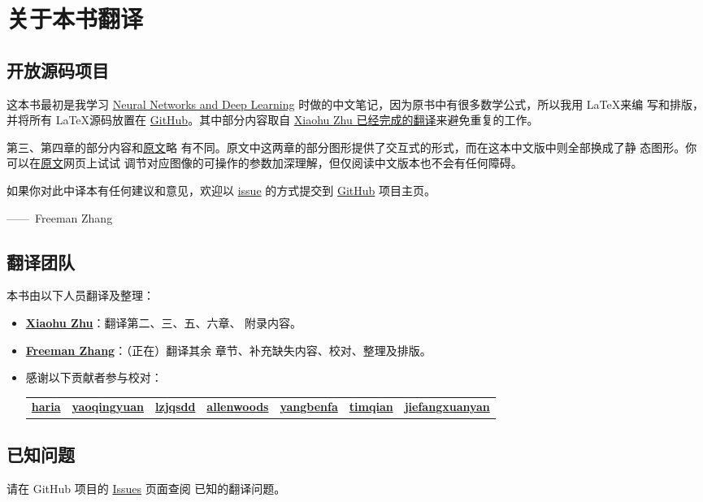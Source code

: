 
\chapter{关于本书翻译}
\label{ch:TranslationTeam}

\section*{开放源码项目}

这本书最初是我学习
\href{http://neuralnetworksanddeeplearning.com/index.html}{Neural Networks and
  Deep Learning} 时做的中文笔记，因为原书中有很多数学公式，所以我用 \LaTeX 来编
写和排版，并将所有 \LaTeX 源码放置在
\href{https://github.com/zhanggyb/nndl}{GitHub}。其中部分内容取自
\href{https://github.com/tigerneil/neural-networks-and-deep-learning-zh-cn}{Xiaohu
  Zhu 已经完成的翻译}来避免重复的工作。

第三、第四章的部分内容和\href{http://neuralnetworksanddeeplearning.com}{原文}略
有不同。原文中这两章的部分图形提供了交互式的形式，而在这本中文版中则全部换成了静
态图形。你可以在\href{http://neuralnetworksanddeeplearning.com}{原文}网页上试试
调节对应图像的可操作的参数加深理解，但仅阅读中文版本也不会有任何障碍。

如果你对此中译本有任何建议和意见，欢迎以
\href{https://github.com/zhanggyb/nndl/issues}{issue} 的方式提交到
\href{https://github.com/zhanggyb/nndl}{GitHub} 项目主页。

\begin{flushright}
  ——~Freeman Zhang
\end{flushright}

\section*{翻译团队}
\label{sec:TranslationTeam}

本书由以下人员翻译及整理：

\begin{itemize}
\item \textbf{\href{mailto:xhzhu.nju@gmail}{Xiaohu Zhu}}：翻译第二、三、五、六章、
  附录内容。
\item \textbf{\href{mailto:zhanggyb@gmail.com}{Freeman Zhang}}：（正在）翻译其余
  章节、补充缺失内容、校对、整理及排版。
\item 感谢以下贡献者参与校对：\\
    \begin{tabular}{l l l l l l l}
      \bfseries\href{https://github.com/haria}{haria} 
      & \bfseries\href{https://github.com/yaoqingyuan}{yaoqingyuan}
      & \bfseries\href{https://github.com/lzjqsdd}{lzjqsdd}
      & \bfseries\href{https://github.com/allenwoods}{allenwoods}
      & \bfseries\href{https://github.com/yangbenfa}{yangbenfa}
      & \bfseries\href{https://github.com/timqian}{timqian}
      & \bfseries\href{https://github.com/jiefangxuanyan}{jiefangxuanyan} \\
    \end{tabular}
\end{itemize}

\section*{已知问题}
\label{sec:KnownIssues}

请在 GitHub 项目的 \href{https://github.com/zhanggyb/nndl/issues}{Issues} 页面查阅
已知的翻译问题。